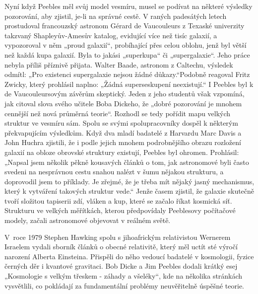   Nyní když Peebles měl svůj model vesmíru, musel se podívat na některé výsledky pozorování, aby
  zjistil, je-li na správné cestě. V raných padesátých letech prostudoval francouzský astronom
  Gérard de Vaucouleurs z Texaské univerzity takzvaný Shapleyův-Amesův katalog, evidující více než
  tisíc galaxií, a vypozoroval v něm „proud galaxií“, probíhající přes celou oblohu, jenž byl větší
  než každá kupa galaxií. Byla to jakási „superkupa“ či „supergalaxie“. Jeho práce nebyla příliš
  příznivě přijata. Walter Baade, astronom z Caltechu, výsledek odmítl: „Pro existenci supergalaxie
  nejsou žádné důkazy.“Podobně reagoval Fritz Zwicky, který prohlásil naplno: „Žádná superseskupení
  neexistují.“ I Peebles byl k de Vaucouleursovým závěrům skeptický. Jeden z jeho studentů však
  vzpomíná, jak citoval slova svého učitele Boba Dickeho, že „dobré pozorování je mnohem cennější
  než nová průměrná teorie“. Rozhodl se tedy pořídit mapu velkých struktur ve vesmíru sám. Spolu se
  svými spolupracovníky dospěl k některým překvapujícím výsledkům. Když dva mladí badatelé z
  Harvardu Marc Davis a John Huchra zjistili, že i podle jejich mnohem podrobnějšího obrazu
  rozložení galaxií na obloze obrovské struktury existují, Peebles byl ohromen. Prohlásil: „Napsal
  jsem několik pěkně kousavých článků o tom, jak astronomové byli často svedeni na nesprávnou cestu
  snahou nalézt v šumu nějakou strukturu, a doprovodil jsem to příklady. Je zřejmé, že je třeba mít
  nějaký jasný mechanismus, který k vytváření takových struktur vede.“ Jenže časem zjistil, že
  galaxie skutečně tvoří složitou tapiserii zdí, vláken a kup, které se začalo říkat kosmická síť.
  Strukturu ve velkých měřítkách, kterou předpovídaly Peeblesovy počítačové modely, začali
  astronomové objevovat v reálném světě. 
  
  V roce 1979 Stephen Hawking spolu s jihoafrickým relativistou Wernerem Israelem vydali sborník
  článků o obecné relativitě, který měl uctít sté výročí narození Alberta Einsteina. Přispěli do
  něho vedoucí badatelé v kosmologii, fyzice černých děr i kvantové gravitaci. Bob Dicke a Jim
  Peebles dodali krátký esej „Kosmologie s velkým třeskem - záhady a všeléky“, kde na několika
  stránkách vysvětlili, co pokládají za fundamentální problémy neuvěřitelně úspěšné teorie. 
  
